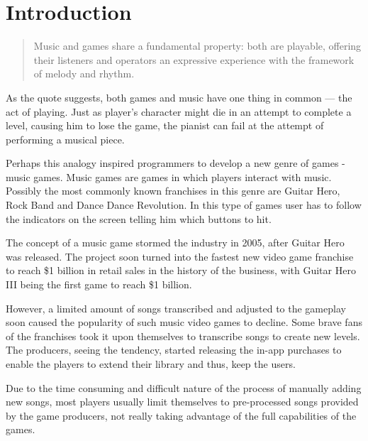 
\chapter{Introduction} %

\label{Chapter1} %



\begin{quotation}
Music and games share a fundamental property: both are playable, offering their listeners and operators an expressive experience with the framework of melody and rhythm. \cite{introquote}
\end{quotation} 

As the quote suggests, both games and music have one thing in common — the act of playing. Just as player’s character might die in an attempt to complete a level, causing him to lose the game, the pianist can fail at the attempt of performing a musical piece. 

Perhaps this analogy inspired programmers to develop a new genre of games - music games. Music games are games in which players interact with music. Possibly the most commonly known franchises in this genre are Guitar Hero, Rock Band and Dance Dance Revolution. In this type of games user has to follow the indicators on the screen telling him which buttons to hit. 

The concept of a music game stormed the industry in 2005, after Guitar Hero was released. The project soon turned into the fastest new video game franchise to reach \$1 billion in retail sales in the history of the business, with Guitar Hero III being the first game to reach \$1 billion. \cite{GHSales}

However, a limited amount of songs transcribed and adjusted to the gameplay soon caused the popularity of such music video games to decline. Some brave fans of the franchises took it upon themselves to transcribe songs to create new levels. The producers, seeing the tendency, started releasing the in-app purchases to enable the players to extend their library and thus, keep the users. 

Due to the time consuming and difficult nature of the process of manually adding new songs, most players usually limit themselves to pre-processed songs provided by the game producers, not really taking advantage of the full capabilities of the games. 

